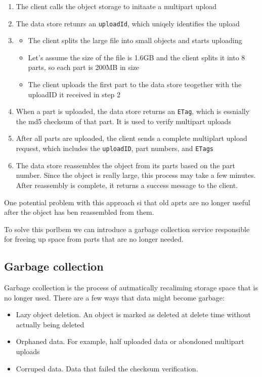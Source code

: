 \documentclass{report}
\theoremstyle{definition}
\let\oldsubsection\subsection
\renewcommand{\subsection}{\oldsubsection*}
\begin{document}
\begin{enumerate}
\item
The client calls the object storage to initaate a multipart upload
\item
The data store retunrs an \lstinline|uploadId|, which uniqely identifies the upload
\item

\begin{itemize}
\item
The client splits the large file into small objects and starts uploading
\item
Let's assume the size of the file is 1.6GB and the client splits it into 8 parts, so each part is 200MB in size
\item
The client uploads the first part to the data store teogether with the uploadID it received in step 2
\end{itemize}
\item
When a part is uploaded, the data store returns an \lstinline|ETag|, which is essnially the md5 checksum of that part. It is used to verify multipart uploads
\item
After all parts are uploaded, the client sends a complete multiplart upload request, which includes the \lstinline|uploadID|, part numbers, and \lstinline|ETags|
\item
The data store reassembles the object from its parts based on the part number. Since the object is really large, this process may take a few minutes. After reassembly is complete, it returns a success message to the client.
\end{enumerate}

One potential problem with this approach si that old aprts are no longer useful after the object has ben reassembled from them.

To solve this porlbem we can introduce a garbage collection service responsible for freeing up space from parts that are no longer needed.

\subsection{Garbage collection}

Garbage ccollection is the process of autmatically recaliming storage space that is no longer used. There are a few ways that data might become garbage:

\begin{itemize}
\item
Lazy object deletion. An object is marked as deleted at delete time without actually being deleted
\item
Orphaned data. For example, half uploaded data or abondoned multipart uploads
\item
Corruped data. Data that failed the checksum verification.
\end{itemize}
\end{document}
